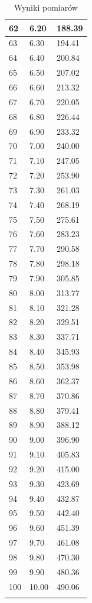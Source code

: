 \documentclass{article}
\begin{document}
\begin{longtable}{|l|l|l|}
        62 & 6.20 & 188.39 \\ \hline
        63 & 6.30 & 194.41 \\ \hline
        64 & 6.40 & 200.84 \\ \hline
        65 & 6.50 & 207.02 \\ \hline
        66 & 6.60 & 213.32 \\ \hline
        67 & 6.70 & 220.05 \\ \hline
        68 & 6.80 & 226.44 \\ \hline
        69 & 6.90 & 233.32 \\ \hline
        70 & 7.00 & 240.00 \\ \hline
        71 & 7.10 & 247.05 \\ \hline
        72 & 7.20 & 253.90 \\ \hline
        73 & 7.30 & 261.03 \\ \hline
        74 & 7.40 & 268.19 \\ \hline
        75 & 7.50 & 275.61 \\ \hline
        76 & 7.60 & 283.23 \\ \hline
        77 & 7.70 & 290.58 \\ \hline
        78 & 7.80 & 298.18 \\ \hline
        79 & 7.90 & 305.85 \\ \hline
        80 & 8.00 & 313.77 \\ \hline
        81 & 8.10 & 321.28 \\ \hline
        82 & 8.20 & 329.51 \\ \hline
        83 & 8.30 & 337.71 \\ \hline
        84 & 8.40 & 345.93 \\ \hline
        85 & 8.50 & 353.98 \\ \hline
        86 & 8.60 & 362.37 \\ \hline
        87 & 8.70 & 370.86 \\ \hline
        88 & 8.80 & 379.41 \\ \hline
        89 & 8.90 & 388.12 \\ \hline
        90 & 9.00 & 396.90 \\ \hline
        91 & 9.10 & 405.83 \\ \hline
        92 & 9.20 & 415.00 \\ \hline
        93 & 9.30 & 423.69 \\ \hline
        94 & 9.40 & 432.87 \\ \hline
        95 & 9.50 & 442.40 \\ \hline
        96 & 9.60 & 451.39 \\ \hline
        97 & 9.70 & 461.08 \\ \hline
        98 & 9.80 & 470.30 \\ \hline
        99 & 9.90 & 480.36 \\ \hline
        100 & 10.00 & 490.06 \\ \hline
\caption{Wyniki pomiarów}
\label{tabelka 1}
\end{longtable}
\end{document}
